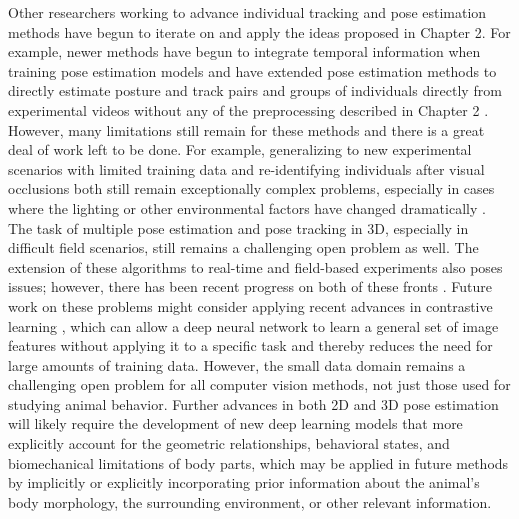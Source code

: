 Other researchers working to advance individual tracking and pose estimation methods have begun to iterate on and apply the ideas proposed in Chapter 2. For example, newer methods have begun to integrate temporal information when training pose estimation models \citep{liu2020optiflex, wu2020deep} and have extended pose estimation methods to directly estimate posture and track pairs and groups of individuals directly from experimental videos without any of the preprocessing described in Chapter 2 \citep{pereira2020sleap}. However, many limitations still remain for these methods and there is a great deal of work left to be done. For example, generalizing to new experimental scenarios with limited training data \citep{mathis2020imagenet} and re-identifying individuals after visual occlusions both still remain exceptionally complex problems, especially in cases where the lighting or other environmental factors have changed dramatically \citep{romero2018idtracker, mathis2020imagenet}. The task of multiple pose estimation and pose tracking in 3D, especially in difficult field scenarios, still remains a challenging open problem as well.  The extension of these algorithms to real-time and field-based experiments also poses issues; however, there has been recent progress on both of these fronts \citep{Zuffi:ICCV:2019, kane2020real}. Future work on these problems might consider applying recent advances in contrastive learning \citep{chen2020simple}, which can allow a deep neural network to learn a general set of image features without applying it to a specific task and thereby reduces the need for large amounts of training data. However, the small data domain remains a challenging open problem for all computer vision methods, not just those used for studying animal behavior. Further advances in both 2D and 3D pose estimation will likely require the development of new deep learning models that more explicitly account for the geometric relationships, behavioral states, and biomechanical limitations of body parts, which may be applied in future methods by implicitly or explicitly incorporating prior information about the animal's body morphology, the surrounding environment, or other relevant information.    

